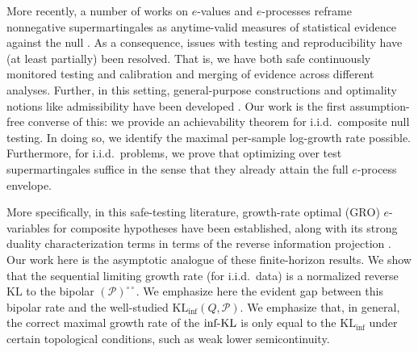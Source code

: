 \documentclass[11pt]{article}
\newcommand{\KL}{\mathrm{KL}}
\newcommand{\KLinf}{\mathrm{KL}_{\mathrm{inf}}}
\newcommand{\infKL}{\textnormal{inf-KL}}
\newcommand{\Pcal}{\mathcal{P}}
\theoremstyle{definition}
\theoremstyle{definition}
\begin{document}
More recently, a number of works on $e$-values and $e$-processes reframe nonnegative supermartingales as anytime-valid measures of statistical evidence against the null \parencite{shafer2011, howard2021, VovkWang2021, ramdas2023, KoningMeer2026}. As a consequence, issues with testing and reproducibility have (at least partially) been resolved. That is, we have both safe continuously monitored testing and calibration and merging of evidence across different analyses. Further, in this setting, general-purpose constructions and optimality notions like admissibility have been developed \parencite{ramdas2020admissible, grunwald2024}. Our work is the first assumption-free converse of this: we provide an achievability theorem for i.i.d.\ composite null testing. In doing so, we identify the maximal per-sample log-growth rate possible. Furthermore, for i.i.d.\ problems, we prove that optimizing over test supermartingales suffice in the sense that they already attain the full $e$-process envelope.

More specifically, in this safe-testing literature, growth-rate optimal ($\mathrm{GRO}$) $e$-variables for composite hypotheses have been established, along with its strong duality characterization terms in terms of the reverse information projection \parencite{grunwald2024, HarremoesLardyGrunwald2023, larsson2025numeraire}. Our work here is the asymptotic analogue of these finite-horizon results. We show that the sequential limiting growth rate (for i.i.d.\ data) is a normalized reverse $\KL$ to the bipolar $(\Pcal)^{\circ\circ}$. We emphasize here the evident gap between this bipolar rate and the well-studied $\KLinf(Q,\Pcal)$. We emphasize that, in general, the correct maximal growth rate of the $\infKL$ is only equal to the $\KLinf$ under certain topological conditions, such as weak lower semicontinuity. 
\end{document}
